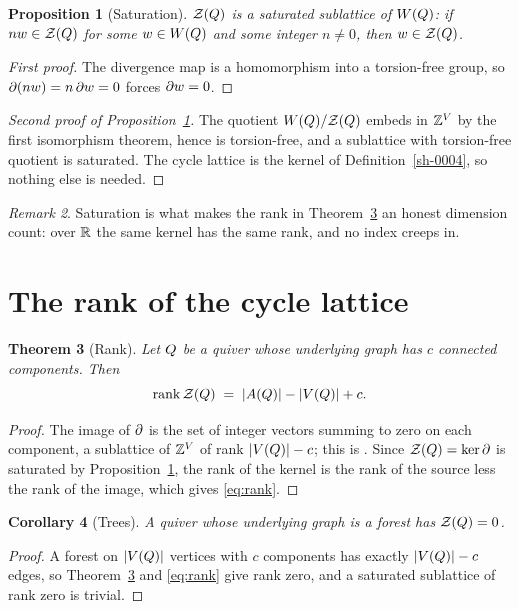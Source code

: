 \documentclass[11pt]{amsart}
\theoremstyle{plain}
\newtheorem{theorem}{Theorem}[section]
\newtheorem{proposition}[theorem]{Proposition}
\newtheorem{corollary}[theorem]{Corollary}
\theoremstyle{definition}
\theoremstyle{remark}
\newtheorem{remark}[theorem]{Remark}
\begin{document}
\begin{proposition}[Saturation]\label{sh-0007}
$\mathcal{Z}(Q)$ is a saturated sublattice of $W(Q)$: if $n w \in \mathcal{Z}(Q)$ for some $w \in W(Q)$ and some integer $n \neq 0$, then $w \in \mathcal{Z}(Q)$.
\end{proposition}
\begin{proof}[First proof]
The divergence map is a homomorphism into a torsion-free group, so $\partial(n w) = n \, \partial w = 0$ forces $\partial w = 0$.
\end{proof}
\begin{proof}[Second proof of Proposition~\ref{sh-0007}]\label{sh-0010}
The quotient $W(Q) / \mathcal{Z}(Q)$ embeds in $\mathbb{Z}^{V}$ by the first isomorphism theorem, hence is torsion-free, and a sublattice with torsion-free quotient is saturated. The cycle lattice is the kernel of Definition~\ref{sh-0004}, so nothing else is needed.
\end{proof}

\begin{remark}\label{sh-0008}
Saturation is what makes the rank in Theorem~\ref{sh-0009} an honest dimension count: over $\mathbb{R}$ the same kernel has the same rank, and no index creeps in.
\end{remark}

\section{The rank of the cycle lattice}\label{sh-0300}

\begin{theorem}[Rank]\label{sh-0009}
Let $Q$ be a quiver whose underlying graph has $c$ connected components. Then
\begin{equation}\label{eq:rank}
\operatorname{rank} \mathcal{Z}(Q) \;=\; |A(Q)| - |V(Q)| + c.
\end{equation}
\end{theorem}
\begin{proof}
The image of $\partial$ is the set of integer vectors summing to zero on each component, a sublattice of $\mathbb{Z}^{V}$ of rank $|V(Q)| - c$; this is \cite[Proposition 2.1]{Arden24}. Since $\mathcal{Z}(Q) = \ker \partial$ is saturated by Proposition~\ref{sh-0007}, the rank of the kernel is the rank of the source less the rank of the image, which gives \eqref{eq:rank}.
\end{proof}

\begin{corollary}[Trees]\label{sh-000A}
A quiver whose underlying graph is a forest has $\mathcal{Z}(Q) = 0$.
\end{corollary}
\begin{proof}
A forest on $|V(Q)|$ vertices with $c$ components has exactly $|V(Q)| - c$ edges, so Theorem~\ref{sh-0009} and \eqref{eq:rank} give rank zero, and a saturated sublattice of rank zero is trivial.
\end{proof}
\end{document}
